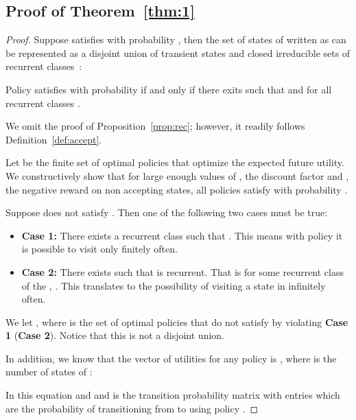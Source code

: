\setlength\abovedisplayskip{3pt}
  \setlength\belowdisplayskip{3pt}
  \setlength\abovedisplayshortskip{3pt}
  \setlength\belowdisplayshortskip{3pt}
\subsection{Proof of Theorem~\ref{thm:1}}
\label{appendix}

\begin{proof}
Suppose  satisfies  with probability , then the set of states of  written as  can be represented as a disjoint union of  transient states and  closed irreducible sets of recurrent classes~\cite{Durrett2012}:



\begin{prop}
\label{prop:rec}
Policy  satisfies  with probability  if and only if there exits  such that  and  for all recurrent classes .
\end{prop}

We omit the proof of Proposition~\ref{prop:rec}; however, it readily follows Definition~\ref{def:accept}.


Let  be the finite set of optimal policies that optimize the expected future utility.  We constructively show that for large enough values of , the discount factor and , the negative reward on non accepting states, all policies  satisfy  with probability .



Suppose  does not satisfy . Then one of the following two cases must be true:

\begin{itemize}
\item {\bf Case 1:} There exists a recurrent class  such that . This means with policy  it is possible to visit  only finitely often.
\item {\bf Case 2:} There exists  such that  is recurrent. That is for some recurrent class of the ,  . This translates to the possibility of visiting a state in  infinitely often.
\end{itemize}

 We let , where  is the set of optimal policies that do not satisfy  by violating {\bf Case 1} ({\bf Case 2}). Notice that this is not a disjoint union. 


In addition, we know that the vector of utilities for any policy  is , where  is the number of states of :



In this equation  and  and  is the transition probability matrix with entries  which are the probability of transitioning from  to  using policy .


\end{proof}
